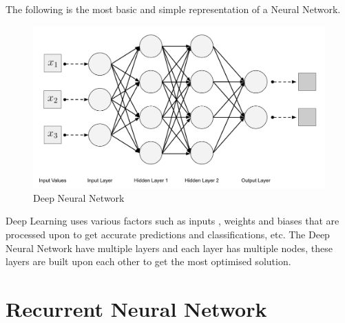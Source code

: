 \documentclass[oneside,12pt]{Classes/RoboticsLaTeX}
\begin{document}
The following is the most basic and simple representation of a Neural Network.

\begin{figure}[H]
  \centering
  \includegraphics[width=0.80\linewidth]{Figures/dnn.png}
  \caption{Deep Neural Network}
  \label{fig:dnn}
\end{figure}

Deep Learning  uses various factors such as inputs , weights and biases that are processed upon to get accurate predictions and classifications, etc. The Deep Neural Network have multiple layers and each layer has multiple nodes, these layers are built upon each other to get the most optimised solution.

\section{Recurrent Neural Network}
\end{document}
